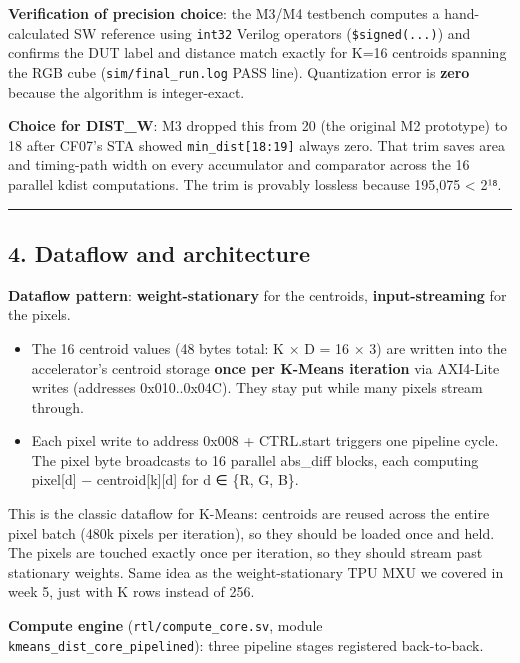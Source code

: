 \documentclass[
  10pt,
]{article}
\providecommand{\tightlist}{%
  \setlength{\itemsep}{0pt}\setlength{\parskip}{0pt}}
\begin{document}
\textbf{Verification of precision choice}: the M3/M4 testbench computes
a hand-calculated SW reference using \texttt{int32} Verilog operators
(\texttt{\$signed(...)}) and confirms the DUT label and distance match
exactly for K=16 centroids spanning the RGB cube
(\texttt{sim/final\_run.log} PASS line). Quantization error is
\textbf{zero} because the algorithm is integer-exact.

\textbf{Choice for DIST\_W}: M3 dropped this from 20 (the original M2
prototype) to 18 after CF07's STA showed \texttt{min\_dist{[}18:19{]}}
always zero. That trim saves area and timing-path width on every
accumulator and comparator across the 16 parallel kdist computations.
The trim is provably lossless because 195,075 \textless{} 2¹⁸.

\begin{center}\rule{0.5\linewidth}{0.5pt}\end{center}

\hypertarget{dataflow-and-architecture}{%
\subsection{4. Dataflow and
architecture}\label{dataflow-and-architecture}}

\textbf{Dataflow pattern}: \textbf{weight-stationary} for the centroids,
\textbf{input-streaming} for the pixels.

\begin{itemize}
\tightlist
\item
  The 16 centroid values (48 bytes total: K × D = 16 × 3) are written
  into the accelerator's centroid storage \textbf{once per K-Means
  iteration} via AXI4-Lite writes (addresses 0x010..0x04C). They stay
  put while many pixels stream through.
\item
  Each pixel write to address 0x008 + CTRL.start triggers one pipeline
  cycle. The pixel byte broadcasts to 16 parallel abs\_diff blocks, each
  computing \textbar pixel{[}d{]} − centroid{[}k{]}{[}d{]}\textbar{} for
  d ∈ \{R, G, B\}.
\end{itemize}

This is the classic dataflow for K-Means: centroids are reused across
the entire pixel batch (480k pixels per iteration), so they should be
loaded once and held. The pixels are touched exactly once per iteration,
so they should stream past stationary weights. Same idea as the
weight-stationary TPU MXU we covered in week 5, just with K rows instead
of 256.

\textbf{Compute engine} (\texttt{rtl/compute\_core.sv}, module
\texttt{kmeans\_dist\_core\_pipelined}): three pipeline stages
registered back-to-back.
\end{document}
